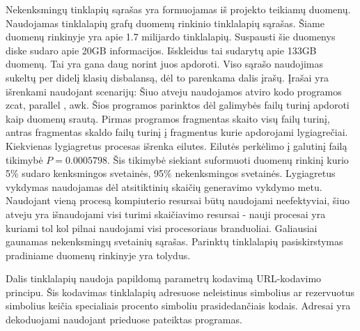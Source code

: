 Nekenksmingų tinklapių sąrašas yra formuojamas iš \cite{webgraph} projekto teikiamų duomenų. Naudojamas tinklalapių grafų duomenų rinkinio tinklalapių sąrašas. Šiame duomenų rinkinyje yra apie 1.7 milijardo tinklalapių. Suspausti šie duomenys diske sudaro apie 20GB informacijos. Išskleidus tai sudarytų apie 133GB duomenų. Tai yra gana daug norint juos apdoroti. Viso sąrašo naudojimas sukeltų per didelį klasių disbalansą, dėl to parenkama dalis įrašų. Įrašai yra išrenkami naudojant scenarijų:
Šiuo atveju naudojamos atviro kodo programos zcat, parallel \cite{parallel}, awk. Šios programos parinktos dėl galimybės failų turinį apdoroti kaip duomenų srautą.   Pirmas programos fragmentas skaito visų failų turinį, antras fragmentas skaldo failų turinį į fragmentus kurie apdorojami lygiagrečiai. Kiekvienas lygiagretus procesas išrenka eilutes. Eilutės perkėlimo į galutinį failą tikimybė $P = 0.0005798$. Šis tikimybė siekiant suformuoti duomenų rinkinį kurio 5\% sudaro kenksmingos svetainės, 95\% nekenksmingos svetainės. Lygiagretus vykdymas naudojamas dėl atsitiktinių skaičių generavimo vykdymo metu. Naudojant vieną procesą kompiuterio resursai būtų naudojami neefektyviai, šiuo atveju yra išnaudojami visi turimi skaičiavimo resursai - nauji procesai yra kuriami tol kol pilnai naudojami visi procesoriaus branduoliai. Galiausiai gaunamas nekenksmingų svetainių sąrašas. Parinktų tinklalapių pasiskirstymas pradiniame duomenų rinkinyje yra tolydus.

Dalis tinklalapių naudoja papildomą parametrų kodavimą URL-kodavimo principu. Šis kodavimas tinklalapių adresuose neleistinus simbolius ar rezervuotus simbolius keičia specialiais procento simboliu prasidedančiais kodais. Adresai yra dekoduojami naudojant prieduose pateiktas programas.